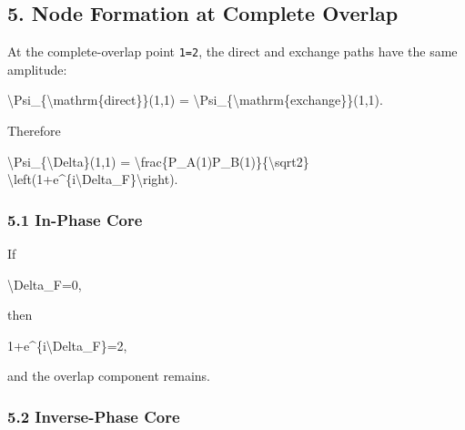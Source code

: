 \documentclass[
  a4paper,
]{article}
\newenvironment{Shaded}{}{}
\newcommand{\NormalTok}[1]{#1}
\begin{document}
\subsection{5. Node Formation at Complete
Overlap}\label{node-formation-at-complete-overlap}

At the complete-overlap point \texttt{1=2}, the direct and exchange
paths have the same amplitude:

\begin{Shaded}
\begin{Highlighting}[]
\NormalTok{\textbackslash{}Psi\_\{\textbackslash{}mathrm\{direct\}\}(1,1)}
\NormalTok{=}
\NormalTok{\textbackslash{}Psi\_\{\textbackslash{}mathrm\{exchange\}\}(1,1).}
\end{Highlighting}
\end{Shaded}

Therefore

\begin{Shaded}
\begin{Highlighting}[]
\NormalTok{\textbackslash{}Psi\_\{\textbackslash{}Delta\}(1,1)}
\NormalTok{=}
\NormalTok{\textbackslash{}frac\{P\_A(1)P\_B(1)\}\{\textbackslash{}sqrt2\}}
\NormalTok{\textbackslash{}left(1+e\^{}\{i\textbackslash{}Delta\_F\}\textbackslash{}right).}
\end{Highlighting}
\end{Shaded}

\subsubsection{5.1 In-Phase Core}\label{in-phase-core}

If

\begin{Shaded}
\begin{Highlighting}[]
\NormalTok{\textbackslash{}Delta\_F=0,}
\end{Highlighting}
\end{Shaded}

then

\begin{Shaded}
\begin{Highlighting}[]
\NormalTok{1+e\^{}\{i\textbackslash{}Delta\_F\}=2,}
\end{Highlighting}
\end{Shaded}

and the overlap component remains.

\subsubsection{5.2 Inverse-Phase Core}\label{inverse-phase-core}
\end{document}

